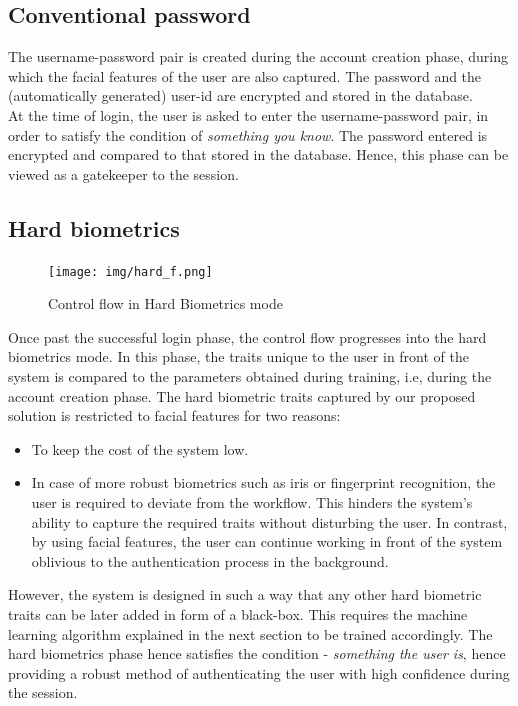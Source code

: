 \documentclass[12pt]{article}			%
\begin{document}
\subsection{Conventional password}
The username-password pair is created during the account creation phase, during which the facial features of the user are also captured.
The password and the (automatically generated) user-id are encrypted and stored in the database.\\
At the time of login, the user is asked to enter the username-password pair, in order to satisfy the condition of \emph{something you know}.
The password entered is encrypted and compared to that stored in the database.
Hence, this phase can be viewed as a gatekeeper to the session. 

\subsection{Hard biometrics}
\begin{figure}[h!]
	\centering
	\texttt{[image: img/hard\_f.png]}
	\caption{Control flow in Hard Biometrics mode}
	\label{fig:cfhb}
\end{figure}
Once past the successful login phase, the control flow progresses into the hard biometrics mode.
In this phase, the traits unique to the user in front of the system is compared to the parameters obtained during training, i.e, during the account creation phase.
The hard biometric traits captured by our proposed solution is restricted to facial features for two reasons:
\begin{itemize}
	\item To keep the cost of the system low.
	\item In case of more robust biometrics such as iris or fingerprint recognition, the user is required to deviate from the workflow. This hinders the system's ability to capture the required traits without disturbing the user. In contrast, by using facial features, the user can continue working in front of the system oblivious to the authentication process in the background.
\end{itemize}
However, the system is designed in such a way that any other hard biometric traits can be later added in form of a black-box. This requires the machine learning algorithm explained in the next section to be trained accordingly.
The hard biometrics phase hence satisfies the condition - \emph{something the user is}, hence providing a robust method of authenticating the user with high confidence during the session.\\
\end{document}
